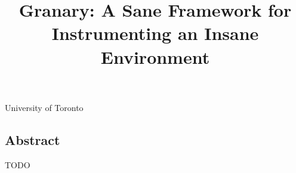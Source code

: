 \documentclass[preprint]{sigplanconf}
\begin{document}

\title{Granary: A Sane Framework for Instrumenting an Insane Environment}

{University of Toronto}{}

\maketitle
\subsection*{Abstract}
TODO

%
\end{document}
